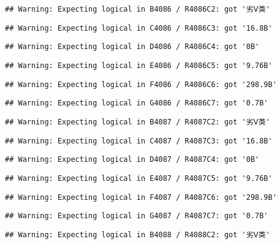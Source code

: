 \documentclass[
]{article}
\begin{document}
\begin{verbatim}
## Warning: Expecting logical in B4086 / R4086C2: got '劣Ⅴ类'
\end{verbatim}

\begin{verbatim}
## Warning: Expecting logical in C4086 / R4086C3: got '16.8B'
\end{verbatim}

\begin{verbatim}
## Warning: Expecting logical in D4086 / R4086C4: got '0B'
\end{verbatim}

\begin{verbatim}
## Warning: Expecting logical in E4086 / R4086C5: got '9.76B'
\end{verbatim}

\begin{verbatim}
## Warning: Expecting logical in F4086 / R4086C6: got '298.9B'
\end{verbatim}

\begin{verbatim}
## Warning: Expecting logical in G4086 / R4086C7: got '0.7B'
\end{verbatim}

\begin{verbatim}
## Warning: Expecting logical in B4087 / R4087C2: got '劣Ⅴ类'
\end{verbatim}

\begin{verbatim}
## Warning: Expecting logical in C4087 / R4087C3: got '16.8B'
\end{verbatim}

\begin{verbatim}
## Warning: Expecting logical in D4087 / R4087C4: got '0B'
\end{verbatim}

\begin{verbatim}
## Warning: Expecting logical in E4087 / R4087C5: got '9.76B'
\end{verbatim}

\begin{verbatim}
## Warning: Expecting logical in F4087 / R4087C6: got '298.9B'
\end{verbatim}

\begin{verbatim}
## Warning: Expecting logical in G4087 / R4087C7: got '0.7B'
\end{verbatim}

\begin{verbatim}
## Warning: Expecting logical in B4088 / R4088C2: got '劣Ⅴ类'
\end{verbatim}
\end{document}
